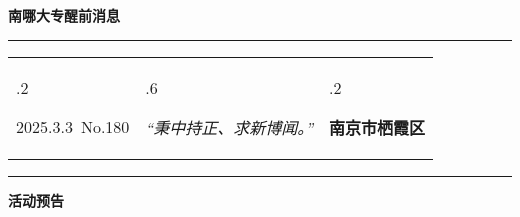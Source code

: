 \documentclass[letterpaper, 12pt]{article}
\begin{document}
\begin{center}
    \Huge\textbf{南哪大专醒前消息}
\end{center}
\vspace{4mm}
\hrule
\renewcommand\tabularxcolumn[1]{m{#1}}
\begin{tabularx}{\textwidth}{>{\hsize.2\hsize}X>{\hsize.6\hsize}X>{\hsize.2\hsize}X}
    \begin{flushleft}
        2025.3.3\, No.180
    \end{flushleft}
    &
    \begin{center}
        \textit{“秉中持正、求新博闻。”}
    \end{center}
    &
    \begin{flushright}
        \textbf{南京市栖霞区}
    \end{flushright}
\end{tabularx}
\vspace{-3.5mm}
\hrule
\vspace{4mm}
\centerline{\huge\textbf{活动预告}}
\end{document}
